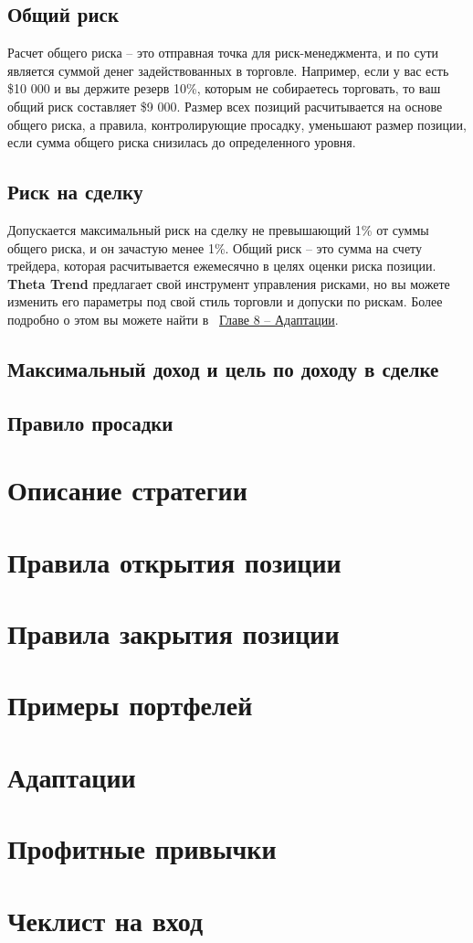 \documentclass[12pt,DIV=18]{scrartcl}
\begin{document}
\subsection{Общий риск}
Расчет общего риска -- это отправная точка для риск-менеджмента, и по сути является суммой денег задействованных в торговле. Например, если у вас есть \$10 000 и вы держите резерв 10\%, которым не собираетесь торговать, то ваш общий риск составляет \$9 000. Размер всех позиций расчитывается на основе общего риска, а правила, контролирующие просадку, уменьшают размер позиции, если сумма общего риска снизилась до определенного уровня.

\subsection{Риск на сделку}
Допускается максимальный риск на сделку не превышающий 1\% от суммы общего риска, и он зачастую менее 1\%. Общий риск -- это сумма на счету трейдера, которая расчитывается ежемесячно в целях оценки риска позиции. \textbf{Theta Trend} предлагает свой инструмент управления рисками, но вы можете изменить его параметры под свой стиль торговли и допуски по рискам. Более подробно о этом вы можете найти в ~\hyperref[chapter8]{\ul{Главе 8} -- Адаптации}.

\subsection{Максимальный доход и цель по доходу в сделке}


\subsection{Правило просадки}









\section{Описание стратегии}
\label{chapter4}
\section{Правила открытия позиции}
\label{chapter5}
\section{Правила закрытия позиции}
\label{chapter6}
\section{Примеры портфелей}
\label{chapter7}
\section{Адаптации}
\label{chapter8}
\section{Профитные привычки}
\label{chapter9}


\appendix
\section{Чеклист на вход}
\label{appendix}
\end{document}
